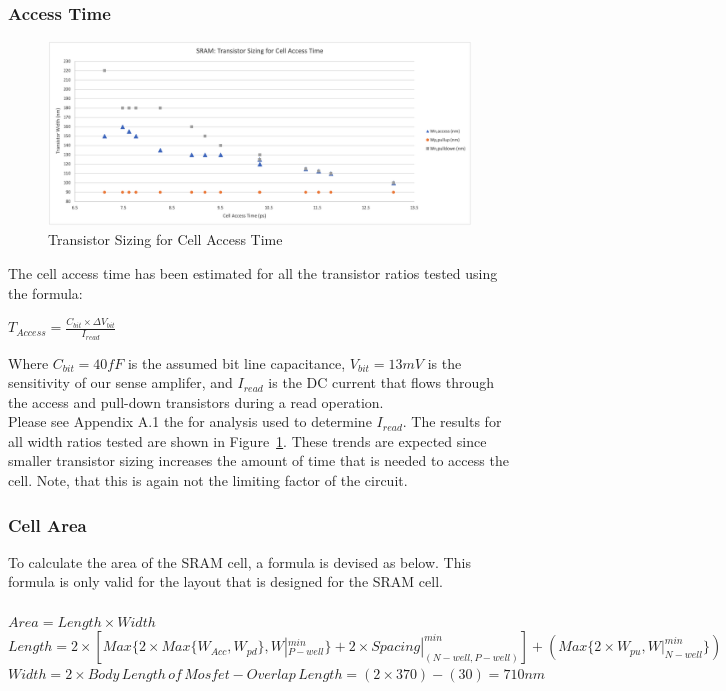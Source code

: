 \documentclass[10pt,letterpaper,onecolumn]{article}
\begin{document}
\subsubsection{Access Time}
\begin{figure}[h!]
\centering
\includegraphics[clip,width=\columnwidth]{Problem2-CellAccessTime.png}
\caption{Transistor Sizing for Cell Access Time}
\label{fig:Cell_Access}
\end{figure}
The cell access time has been estimated for all the transistor ratios tested using the formula:
\begin{center}
    $T_{Access} = \frac{C_{bit}\times \Delta V_{bit}}{I_{read}}$
\end{center}
Where $C_{bit} = 40fF$ is the assumed bit line capacitance, $V_{bit} = 13mV$ is the sensitivity of our sense amplifer, and $I_{read}$ is the DC current that flows through the access and pull-down transistors during a read operation.\\
Please see Appendix A.1 the for analysis used to determine $I_{read}$. The results for all width ratios tested are shown in Figure~\ref{fig:Cell_Access}. These trends are expected since smaller transistor sizing increases the amount of time that is needed to access the cell. Note, that this is again not the limiting factor of the circuit.

\subsubsection{Cell Area}
To calculate the area of the SRAM cell, a formula is devised as below. This formula is only valid for the layout that is designed for the SRAM cell.\\
\\
$Area = Length\times Width$\\
$Length = 2\times [Max \{ 2\times Max\{ W_{Acc},W_{pd}\},W|^{min}_{P-well}\} + 2\times Spacing|^{min}_{(N-well,P-well)}]+(Max \{ 2\times W_{pu},W|^{min}_{N-well} \} )$
$Width = 2\times Body\,Length\,of\,Mosfet - Overlap\,Length = (2\times 370)-(30) = 710 nm$
\end{document}
